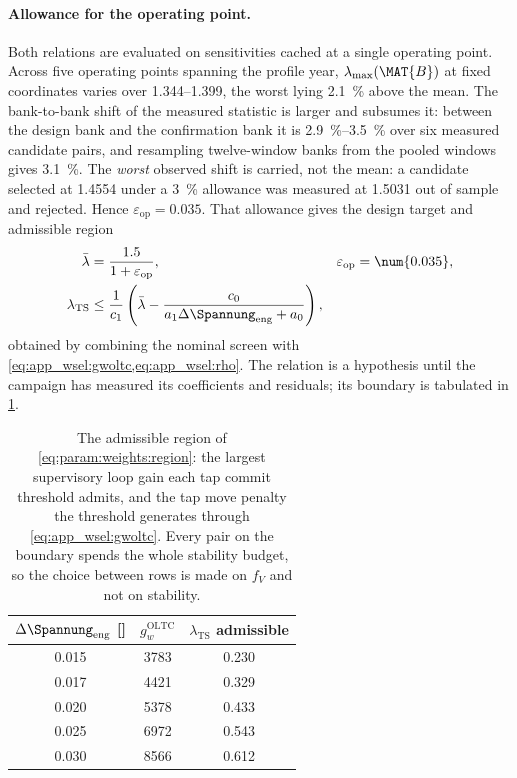 \paragraph{Allowance for the operating point.}
Both relations are evaluated on sensitivities cached at a single operating point.
Across five operating points spanning the profile year, $\lambda_{\max}(\MAT{B})$ at fixed coordinates varies over \numrange{1.344}{1.399}, the worst lying \qty{2.1}{\percent} above the mean. The bank-to-bank shift of the measured statistic is larger and subsumes it: between the design bank and the confirmation bank it is \qtyrange{2.9}{3.5}{\percent} over six measured candidate pairs, and resampling twelve-window banks from the pooled windows gives \qty{3.1}{\percent}. The \emph{worst} observed shift is carried, not the mean: a candidate selected at \num{1.4554} under a \qty{3}{\percent} allowance was measured at \num{1.5031} out of sample and rejected. Hence $\varepsilon_{\mathrm{op}} = \num{0.035}$.
That allowance gives the design target and admissible region
\begin{align}
	\bar{\lambda}&=\frac{1.5}{1+\varepsilon_{\mathrm{op}}},
	&\varepsilon_{\mathrm{op}}&=\num{0.035},
	\label{eq:param:weights:target}\\
	\lambda_{\mathrm{TS}}&\leq\frac{1}{c_{1}}
	\left(\bar{\lambda}-\frac{c_{0}}{a_{1}\Delta\Spannung_{\mathrm{eng}}+a_{0}}\right),
	&&\label{eq:param:weights:region}
\end{align}
obtained by combining the nominal screen with \cref{eq:app_wsel:gwoltc,eq:app_wsel:rho}.
The relation is a hypothesis until the campaign has measured its coefficients and residuals; its boundary is tabulated in \cref{tab:app_wsel:region}.

\begin{table}[htbp]
	\centering
	\caption[The admissible region of the two supervisory coordinates.]%
	{The admissible region of \cref{eq:param:weights:region}: the largest supervisory loop gain each tap commit threshold admits, and the tap move penalty the threshold generates through \cref{eq:app_wsel:gwoltc}.
		Every pair on the boundary spends the whole stability budget, so the choice between rows is made on $f_{V}$ and not on stability.}
	\label{tab:app_wsel:region}
	\small
	\begin{tabular}{c c c}
		\toprule
		$\Delta\Spannung_{\mathrm{eng}}$ [\si{\perunit}] & $g_{w}^{\mathrm{OLTC}}$ & $\lambda_{\mathrm{TS}}$ admissible \\
		\midrule
		\num{0.015} & \num{3783} & \num{0.230} \\
		\num{0.017} & \num{4421} & \num{0.329} \\
		\num{0.020} & \num{5378} & \num{0.433} \\
		\num{0.025} & \num{6972} & \num{0.543} \\
		\num{0.030} & \num{8566} & \num{0.612} \\
		\bottomrule
	\end{tabular}
\end{table}

